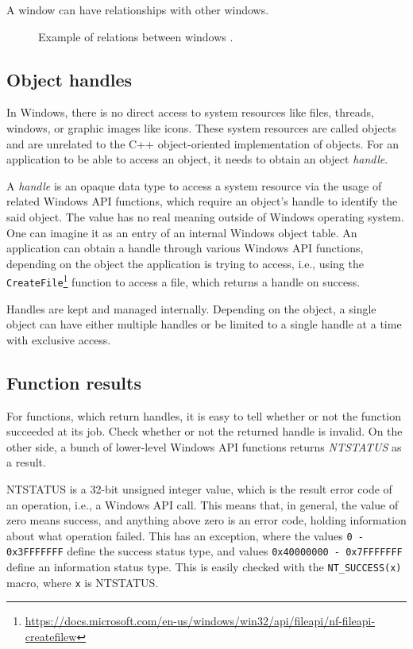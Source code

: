 A window can have relationships with other windows.\cite{WinWindow}
\begin{figure}[htbp]
	\centering

	\caption{Example of relations between windows .}
	\label{windowsExample}
\end{figure}

\subsection*{Object handles}
\label{ch2handle}
In Windows, there is no direct access to system resources like files, threads, windows, or graphic images like icons. These system resources are called objects and are unrelated to the C++ object-oriented implementation of objects. For an application to be able to access an object, it needs to obtain an object \textit{handle}.

A \textit{handle} is an opaque data type to access a system resource via the usage of related Windows API functions, which require an object's handle to identify the said object. The value has no real meaning outside of Windows operating system. One can imagine it as an entry of an internal Windows object table. An application can obtain a handle through various Windows API functions, depending on the object the application is trying to access, i.e., using the \lstinline{CreateFile}\footnote{\url{https://docs.microsoft.com/en-us/windows/win32/api/fileapi/nf-fileapi-createfilew}} function to access a file, which returns a handle on success.\cite{HandlesAndObjects}

Handles are kept and managed internally. Depending on the object, a single object can have either multiple handles or be limited to a single handle at a time with exclusive access.\cite{WinHandleLimits}

\subsection*{Function results}
For functions, which return handles, it is easy to tell whether or not the function succeeded at its job. Check whether or not the returned handle is invalid. On the other side, a bunch of lower-level Windows API functions returns \textit{NTSTATUS} as a result.

NTSTATUS is a 32-bit unsigned integer value, which is the result error code of an operation, i.e., a Windows API call. This means that, in general, the value of zero means success, and anything above zero is an error code, holding information about what operation failed. This has an exception, where the values \lstinline{0 - 0x3FFFFFFF} define the success status type, and values 
\lstinline{0x40000000 - 0x7FFFFFFF} define an information status type. This is easily checked with the \lstinline{NT_SUCCESS(x)} macro, where \lstinline{x} is NTSTATUS.\cite{WinNTSTATUS}\cite{WinNTSuccess}

